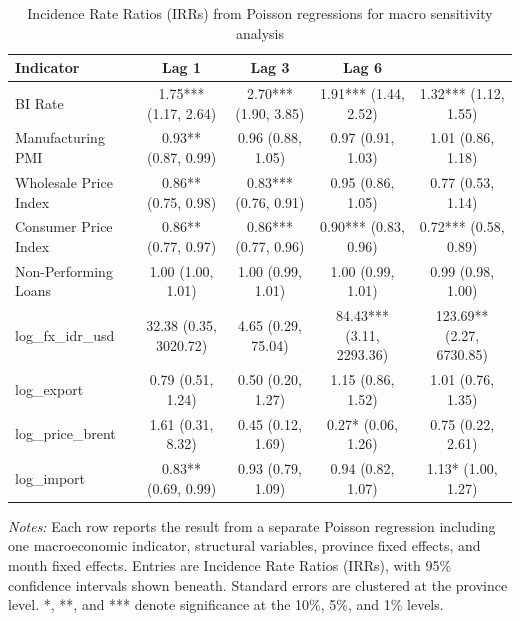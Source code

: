 \begin{table}[htbp]
\centering
\caption{Incidence Rate Ratios (IRRs) from Poisson regressions for macro sensitivity analysis}
\small
\begin{tabular}{lcccc}
\toprule
Indicator & Lag 1 & Lag 3 & Lag 6 \\ \midrule
BI Rate&1.75***
(1.17, 2.64)&2.70***
(1.90, 3.85)&1.91***
(1.44, 2.52)&1.32***
(1.12, 1.55)\\
Manufacturing PMI&0.93**
(0.87, 0.99)&0.96
(0.88, 1.05)&0.97
(0.91, 1.03)&1.01
(0.86, 1.18)\\
Wholesale Price Index&0.86**
(0.75, 0.98)&0.83***
(0.76, 0.91)&0.95
(0.86, 1.05)&0.77
(0.53, 1.14)\\
Consumer Price Index&0.86**
(0.77, 0.97)&0.86***
(0.77, 0.96)&0.90***
(0.83, 0.96)&0.72***
(0.58, 0.89)\\
Non-Performing Loans&1.00
(1.00, 1.01)&1.00
(0.99, 1.01)&1.00
(0.99, 1.01)&0.99
(0.98, 1.00)\\
log_fx_idr_usd&32.38
(0.35, 3020.72)&4.65
(0.29, 75.04)&84.43***
(3.11, 2293.36)&123.69**
(2.27, 6730.85)\\
log_export&0.79
(0.51, 1.24)&0.50
(0.20, 1.27)&1.15
(0.86, 1.52)&1.01
(0.76, 1.35)\\
log_price_brent&1.61
(0.31, 8.32)&0.45
(0.12, 1.69)&0.27*
(0.06, 1.26)&0.75
(0.22, 2.61)\\
log_import&0.83**
(0.69, 0.99)&0.93
(0.79, 1.09)&0.94
(0.82, 1.07)&1.13*
(1.00, 1.27)\\
\bottomrule
\end{tabular}
\vspace{0.2cm}
\begin{minipage}{0.95\linewidth}
\footnotesize
\textit{Notes:} Each row reports the result from a separate Poisson regression including one macroeconomic indicator, structural variables, province fixed effects, and month fixed effects. Entries are Incidence Rate Ratios (IRRs), with 95\% confidence intervals shown beneath. Standard errors are clustered at the province level. *, **, and *** denote significance at the 10\%, 5\%, and 1\% levels.
\end{minipage}
\end{table}
